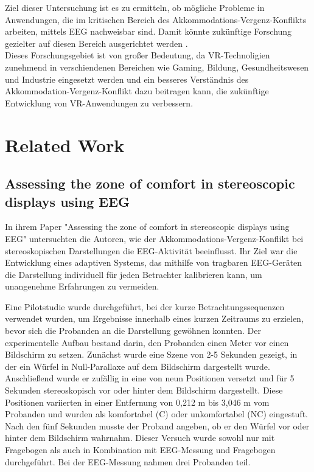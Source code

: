 \documentclass[conference]{IEEEtran}
\begin{document}
Ziel dieser Untersuchung ist es zu ermitteln, ob mögliche Probleme in Anwendungen, die im kritischen Bereich des Akkommodations-Vergenz-Konflikts arbeiten, mittels EEG nachweisbar sind. Damit könnte zukünftige Forschung gezielter auf diesen Bereich ausgerichtet werden \cite{b8}.\\
Dieses Forschungsgebiet ist von großer Bedeutung, da VR-Technoligien zunehmend in verschiendenen Bereichen wie Gaming, Bildung, Gesundheitswesen und Industrie eingesetzt werden und ein besseres Verständnis des Akkommodation-Vergenz-Konflikt dazu beitragen kann, die zukünftige Entwicklung von VR-Anwendungen zu verbessern.

\section{Related Work}
\subsection{Assessing the zone of comfort in stereoscopic displays using EEG}
In ihrem Paper "Assessing the zone of comfort in stereoscopic displays using EEG" \cite{b1} untersuchten die Autoren, wie der Akkommodations-Vergenz-Konflikt bei stereoskopischen Darstellungen die EEG-Aktivität beeinflusst. Ihr Ziel war die Entwicklung eines adaptiven Systems, das mithilfe von tragbaren EEG-Geräten die Darstellung individuell für jeden Betrachter kalibrieren kann, um unangenehme Erfahrungen zu vermeiden.

Eine Pilotstudie wurde durchgeführt, bei der kurze Betrachtungssequenzen verwendet wurden, um Ergebnisse innerhalb eines kurzen Zeitraums zu erzielen, bevor sich die Probanden an die Darstellung gewöhnen konnten. Der experimentelle Aufbau bestand darin, den Probanden einen Meter vor einen Bildschirm zu setzen. Zunächst wurde eine Szene von 2-5 Sekunden gezeigt, in der ein Würfel in Null-Parallaxe auf dem Bildschirm dargestellt wurde. Anschließend wurde er zufällig in eine von neun Positionen versetzt und für 5 Sekunden stereoskopisch vor oder hinter dem Bildschirm dargestellt. Diese Positionen variierten in einer Entfernung von 0,212 m bis 3,046 m vom Probanden und wurden als komfortabel (C) oder unkomfortabel (NC) eingestuft. Nach den fünf Sekunden musste der Proband angeben, ob er den Würfel vor oder hinter dem Bildschirm wahrnahm. Dieser Versuch wurde sowohl nur mit Fragebogen als auch in Kombination mit EEG-Messung und Fragebogen durchgeführt. Bei der EEG-Messung nahmen drei Probanden teil.
 
\end{document}
